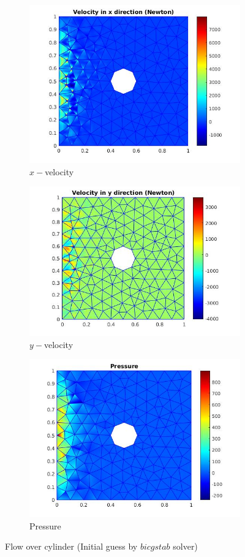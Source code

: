 \documentclass[a4paper,twoside,openright]{book}
\begin{document}
\begin{figure}
  \begin{subfigure}{\textwidth}
    \includegraphics[width=0.8\linewidth]{cylinder_newton_vx_bicgstab.jpg}
    \caption{$x-$velocity }
  \label{x_vel_navier_stoke_bicgstab}
  \end{subfigure}
  \begin{subfigure}{\textwidth}
    \includegraphics[width=0.8\linewidth]{cylinder_newton_vy_bicgstab.jpg}
    \caption{$y-$velocity}
  \label{y_vel_navier_stoke_bicgstab}
  \end{subfigure}
  \begin{subfigure}{\textwidth}
    \includegraphics[width=0.8\linewidth]{cylinder_newton_pressure_bicgstab.jpg}
    \caption{Pressure}
  \label{pressure_navier_stoke_bicgstab}
  \end{subfigure}
\caption{Flow over cylinder (Initial guess by $bicgstab$ solver)}
\label{flow_over_cylinder_bicgstab_n_s}
\end{figure}
\end{document}
